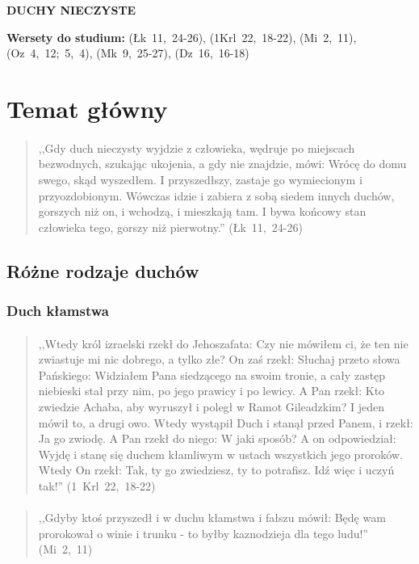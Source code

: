\documentclass[10pt,a4paper,oneside]{article}
\begin{document}
\centerline{\textbf{\MakeUppercase{Duchy nieczyste}}}
\begin{center}
\textbf{Wersety do studium:} \mbox{(Łk 11, 24-26)}, \mbox{(1Krl 22, 18-22)}, \mbox{(Mi 2, 11)}, \mbox{(Oz 4, 12; 5, 4)}, \mbox{(Mk 9, 25-27)}, \mbox{(Dz 16, 16-18)}
\end{center}
\section{Temat główny}
\paragraph{}
\begin{quote}
,,Gdy duch nieczysty wyjdzie z człowieka, wędruje po miejscach bezwodnych, szukając ukojenia, a gdy nie znajdzie, mówi: Wrócę do domu swego, skąd wyszedłem. I przyszedłszy, zastaje go wymiecionym i przyozdobionym. Wówczas idzie i zabiera z sobą siedem innych duchów, gorszych niż on, i wchodzą, i mieszkają tam. I bywa końcowy stan człowieka tego, gorszy niż pierwotny.'' \mbox{(Łk 11, 24-26)}
\end{quote}
\subsection{Różne rodzaje duchów}
\subsubsection{Duch kłamstwa}
\paragraph{}
\begin{quote}
,,Wtedy król izraelski rzekł do Jehoszafata: Czy nie mówiłem ci, że ten nie zwiastuje mi nic dobrego, a tylko złe? On zaś rzekł: Słuchaj przeto słowa Pańskiego: Widziałem Pana siedzącego na swoim tronie, a cały zastęp niebieski stał przy nim, po jego prawicy i po lewicy. A Pan rzekł: Kto zwiedzie Achaba, aby wyruszył i poległ w Ramot Gileadzkim? I jeden mówił to, a drugi owo. Wtedy wystąpił Duch i stanął przed Panem, i rzekł: Ja go zwiodę. A Pan rzekł do niego: W jaki sposób? A on odpowiedział: Wyjdę i stanę się duchem kłamliwym w ustach wszystkich jego proroków. Wtedy On rzekł: Tak, ty go zwiedziesz, ty to potrafisz. Idź więc i uczyń tak!'' \mbox{(1 Krl 22, 18-22)}
\end{quote}
\paragraph{}
\begin{quote}
,,Gdyby ktoś przyszedł i w duchu kłamstwa i fałszu mówił: Będę wam prorokował o winie i trunku - to byłby kaznodzieja dla tego ludu!'' \mbox{(Mi 2, 11)}
\end{quote}
\end{document}
